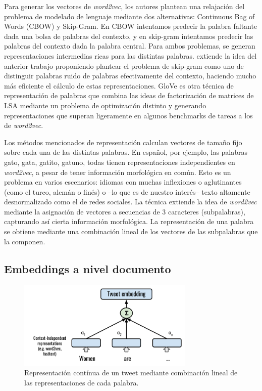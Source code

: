 Para generar los vectores de \emph{word2vec}, los autores plantean una relajación del problema de modelado de lenguaje mediante dos alternativas: Continuous Bag of Words (CBOW) y Skip-Gram. En CBOW intentamos predecir la palabra faltante dada una bolsa de palabras del contexto, y en skip-gram intentamos predecir las palabras del contexto dada la palabra central. Para ambos problemas, se generan representaciones intermedias ricas para las distintas palabras. \citet{mikolov2013efficient} extiende la idea del anterior trabajo proponiendo plantear el problema de skip-gram como uno de distinguir palabras ruido de palabras efectivamente del contexto, haciendo mucho más eficiente el cálculo de estas representaciones. GloVe \cite{pennington2014glove} es otra técnica de representación de palabras que combina las ideas de factorización de matrices de LSA  mediante un problema de optimización distinto y generando representaciones que superan ligeramente en algunos benchmarks de tareas a los de \emph{word2vec}.

Los métodos mencionados de representación calculan vectores de tamaño fijo sobre cada una de las distintas palabras. En español, por ejemplo, las palabras gato, gata, gatito, gatuno, todas tienen representaciones independientes en \emph{word2vec}, a pesar de tener información morfológica en común. Esto es un problema en varios escenarios: idiomas con muchas inflexiones o aglutinantes (como el turco, alemán o finés) o --lo que es de nuestro interés-- texto altamente desnormalizado como el de redes sociales. La técnica \fasttext{} \cite{bojanowski16} extiende la idea de \emph{word2vec} mediante la asignación de vectores a secuencias de 3 caracteres (subpalabras), capturando así cierta información morfológica. La representación de una palabra se obtiene mediante una combinación lineal de los vectores de las subpalabras que la componen.

\subsection{Embeddings a nivel documento}
\label{sec:02_tweet_embeddings}


\begin{figure}[t]
    \centering
    \includegraphics[width=0.75\textwidth]{img/tweet_embeddings.pdf}
    \caption{Representación contínua de un tweet mediante combinación lineal de las representaciones de cada palabra.}
    \label{fig:tweet_embeddings}
\end{figure}

